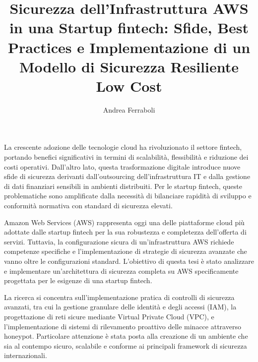\documentclass[a4paper,12pt]{report}
\begin{document}
\title{Sicurezza dell'Infrastruttura AWS in una Startup fintech: Sfide, Best Practices e Implementazione di un Modello di Sicurezza Resiliente Low Cost}
\author{Andrea Ferraboli}
\maketitlepage
\cleardoublepage
{}   %
\setcounter{page}{1}
La crescente adozione delle tecnologie cloud ha rivoluzionato il settore fintech, 
portando benefici significativi in termini di scalabilità, flessibilità e riduzione 
dei costi operativi. Dall'altro lato, questa trasformazione digitale introduce 
nuove sfide di sicurezza derivanti dall'outsourcing dell'infrastruttura IT e dalla 
gestione di dati finanziari sensibili in ambienti distribuiti. Per le startup fintech, 
queste problematiche sono amplificate dalla necessità di bilanciare rapidità di 
sviluppo e conformità normativa con standard di sicurezza elevati.

Amazon Web Services (AWS) rappresenta oggi una delle piattaforme cloud più 
adottate dalle startup fintech per la sua robustezza e completezza dell'offerta di 
servizi. Tuttavia, la configurazione sicura di un'infrastruttura AWS richiede competenze 
specifiche e l'implementazione di strategie di sicurezza avanzate che vanno oltre 
le configurazioni standard. L'obiettivo di questa tesi è stato analizzare e implementare 
un'architettura di sicurezza completa su AWS specificamente progettata per le 
esigenze di una startup fintech.

La ricerca si concentra sull'implementazione pratica di controlli di sicurezza 
avanzati, tra cui la gestione granulare delle identità e degli accessi (IAM), la 
progettazione di reti sicure mediante Virtual Private Cloud (VPC), e l'implementazione 
di sistemi di rilevamento proattivo delle minacce attraverso honeypot. Particolare 
attenzione è stata posta alla creazione di un ambiente che sia al contempo sicuro, 
scalabile e conforme ai principali framework di sicurezza internazionali.
\end{document}
